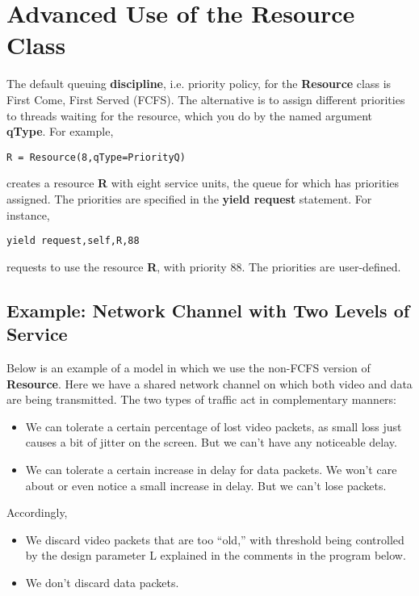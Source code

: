 \documentclass[11pt]{article}
\begin{document}
\section{Advanced Use of the Resource Class}

The default queuing {\bf discipline}, i.e. priority policy, for the {\bf
Resource} class is First Come, First Served (FCFS).  The alternative is
to assign different priorities to threads waiting for the resource,
which you do by the named argument {\bf qType}.  For example, 

\begin{Verbatim}[fontsize=\relsize{-2}]
R = Resource(8,qType=PriorityQ)
\end{Verbatim}

creates a resource {\bf R} with eight service units, the queue for which
has priorities assigned.  The priorities are specified in the {\bf yield
request} statement.  For instance,

\begin{Verbatim}[fontsize=\relsize{-2}]
yield request,self,R,88
\end{Verbatim}

requests to use the resource {\bf R}, with priority 88.  The priorities
are user-defined.

\subsection{Example:  Network Channel with Two Levels of Service}

Below is an example of a model in which we use the non-FCFS version of
{\bf Resource}.  Here we have a shared network channel on which both
video and data are being transmitted.  The two types of traffic act in
complementary manners:

\begin{itemize}

\item We can tolerate a certain percentage of lost video packets, as
small loss just causes a bit of jitter on the screen.  But we can't have
any noticeable delay.

\item We can tolerate a certain increase in delay for data packets. 
We won't care about or even notice a small increase in delay.  But we
can't lose packets.

\end{itemize}

Accordingly, 

\begin{itemize}

\item We discard video packets that are too ``old,'' with threshold
being controlled by the design parameter L explained in the comments in
the program below.

\item We don't discard data packets.

\end{itemize}
\end{document}
